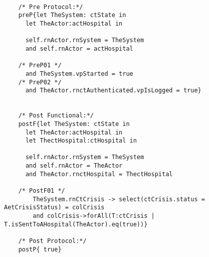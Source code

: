 	\scriptsize
	\vspace{0.5cm}
	\begin{lstlisting}[style=MessirStyle,firstnumber=auto,captionpos=b,caption={\msrmessir (MCL-oriented) specification of the operation \emph{oeGetHospitalCrisisSet}.},label=OM-actHospital-oeGetHospitalCrisisSet-MCL-LST]

	/* Pre Protocol:*/ 
	preP{let TheSystem: ctState in
	  let TheActor:actHospital in
	  
	  self.rnActor.rnSystem = TheSystem
	  and self.rnActor = actHospital
	  
	/* PreP01 */
	  and TheSystem.vpStarted = true
	/* PreP02 */
	  and TheActor.rnctAuthenticated.vpIsLogged = true}
	
	
	/* Post Functional:*/ 
	postF{let TheSystem: ctState in
	  let TheActor:actHospital in
	  let ThectHospital:ctHospital in
	  
	  self.rnActor.rnSystem = TheSystem
	  and self.rnActor = TheActor
	  and TheActor.rnctHospital = ThectHospital
	  
	/* PostF01 */
		TheSystem.rnCtCrisis -> select(ctCrisis.status = AetCrisisStatus) = colCrisis
		and colCrisis->forAll(T:ctCrisis | T.isSentToAHospital(TheActor).eq(true))}
	
	/* Post Protocol:*/ 
	postP{ true}
	
	\end{lstlisting}
	\normalsize 
	
	
	
	





